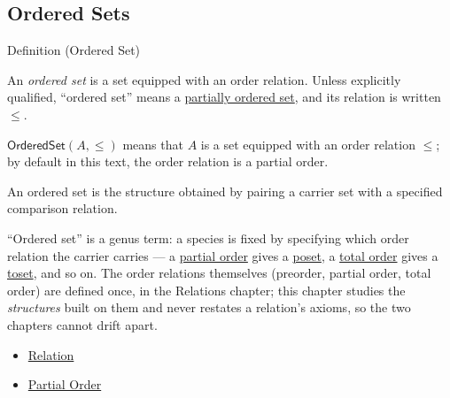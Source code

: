 
\subsection{Ordered Sets}\label{sec:ordered-sets}


\begin{definitionbox}{Definition (Ordered Set)}
\begin{definition}\label{def:ordered-set}
An \emph{ordered set} is a set equipped with an order relation. Unless
explicitly qualified, ``ordered set'' means a
\hyperref[def:partially-ordered-set]{partially ordered set}, and its relation
is written $\leq$.
\end{definition}
\end{definitionbox}

\begin{remark*}
$\mathsf{OrderedSet}(A,\leq)$ means that $A$ is a set equipped with an order
relation $\leq$; by default in this text, the order relation is a partial
order.
\end{remark*}

\begin{remark*}[Interpretation]
An ordered set is the structure obtained by pairing a carrier set with a
specified comparison relation.
\end{remark*}

\begin{remark*}[Exposition]
``Ordered set'' is a genus term: a species is fixed by specifying which order
relation the carrier carries --- a \hyperref[def:partial-order]{partial order}
gives a \hyperref[def:partially-ordered-set]{poset}, a
\hyperref[def:total-order]{total order} gives a
\hyperref[def:totally-ordered-set]{toset}, and so on. The order relations
themselves (preorder, partial order, total order) are defined once, in the
Relations chapter; this chapter studies the \emph{structures} built on them and
never restates a relation's axioms, so the two chapters cannot drift apart.
\end{remark*}

\begin{dependencies}
\begin{itemize}
  \item \hyperref[def:relation]{Relation}
  \item \hyperref[def:partial-order]{Partial Order}
\end{itemize}
\end{dependencies}

